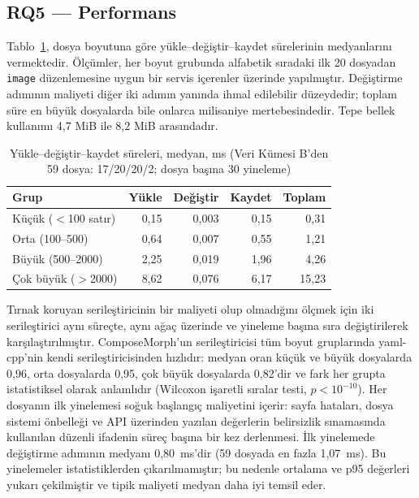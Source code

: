 \documentclass[12pt,a4paper]{article}
\begin{document}
\subsection{RQ5 --- Performans}
Tablo~\ref{tab:perf}, dosya boyutuna göre yükle--değiştir--kaydet
sürelerinin medyanlarını vermektedir. Ölçümler, her boyut grubunda
alfabetik sıradaki ilk 20 dosyadan \texttt{image} düzenlemesine uygun bir
servis içerenler üzerinde yapılmıştır. Değiştirme adımının maliyeti diğer
iki adımın yanında ihmal edilebilir düzeydedir; toplam süre en büyük
dosyalarda bile onlarca milisaniye mertebesindedir. Tepe bellek kullanımı
4,7 MiB ile 8,2 MiB arasındadır.

\begin{table}[t]
\caption{Yükle--değiştir--kaydet süreleri, medyan, ms (Veri Kümesi B'den
59 dosya: 17/20/20/2; dosya başına 30 yineleme)}
\label{tab:perf}
\centering
\begin{tabular}{lrrrr}
\toprule
Grup & Yükle & Değiştir & Kaydet & Toplam \\
\midrule
Küçük ($<$100 satır) & 0,15 & 0,003 & 0,15 & 0,31 \\
Orta (100--500) & 0,64 & 0,007 & 0,55 & 1,21 \\
Büyük (500--2000) & 2,25 & 0,019 & 1,96 & 4,26 \\
Çok büyük ($>$2000) & 8,62 & 0,076 & 6,17 & 15,23 \\
\bottomrule
\end{tabular}
\end{table}

Tırnak koruyan serileştiricinin bir maliyeti olup olmadığını ölçmek için
iki serileştirici aynı süreçte, aynı ağaç üzerinde ve yineleme başına sıra
değiştirilerek karşılaştırılmıştır. ComposeMorph'un serileştiricisi tüm
boyut gruplarında yaml-cpp'nin kendi serileştiricisinden hızlıdır: medyan
oran küçük ve büyük dosyalarda 0,96, orta dosyalarda 0,95, çok büyük
dosyalarda 0,82'dir ve fark her grupta istatistiksel olarak anlamlıdır
(Wilcoxon işaretli sıralar testi, $p < 10^{-10}$). Her dosyanın ilk
yinelemesi soğuk başlangıç maliyetini içerir: sayfa hataları, dosya sistemi
önbelleği ve API üzerinden yazılan değerlerin belirsizlik sınamasında
kullanılan düzenli ifadenin süreç başına bir kez derlenmesi. İlk yinelemede
değiştirme adımının medyanı 0,80~ms'dir (59 dosyada en fazla 1,07~ms).
Bu yinelemeler istatistiklerden çıkarılmamıştır; bu nedenle ortalama ve
p95 değerleri yukarı çekilmiştir ve tipik maliyeti medyan daha iyi temsil
eder.
\end{document}
